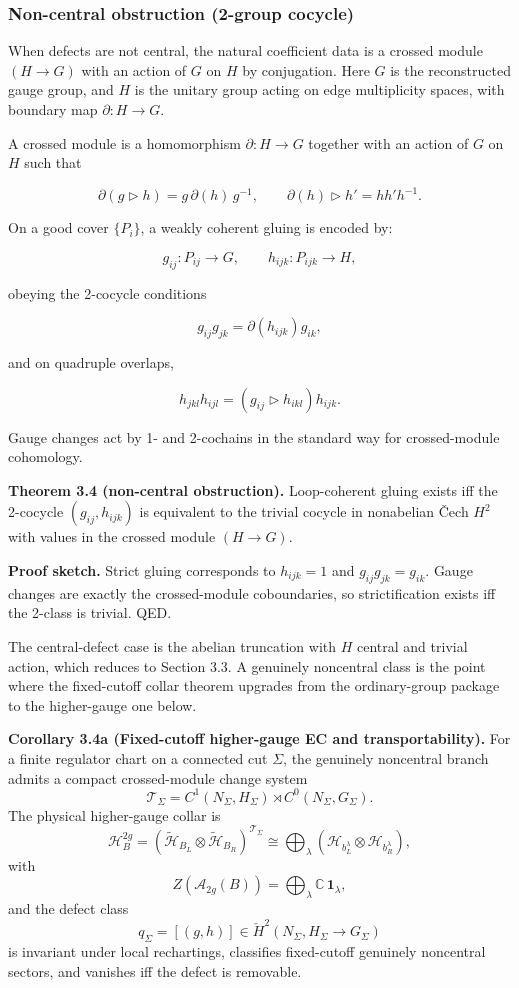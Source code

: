 \subsubsection{Non-central obstruction (2-group cocycle)}\label{34-non-central-obstruction-2-group-cocycle}

When defects are not central, the natural coefficient data is a crossed module \((H \to G)\) with an action of \(G\) on \(H\) by conjugation. Here \(G\) is the reconstructed gauge group, and \(H\) is the unitary group acting on edge multiplicity spaces, with boundary map \(\partial: H \to G\).

A crossed module is a homomorphism \(\partial: H \to G\) together with an action of \(G\) on \(H\) such that

\[
\partial(g \triangleright h) = g\,\partial(h)\,g^{-1},
\qquad
\partial(h) \triangleright h' = h h' h^{-1}.
\]

On a good cover \(\{P_i\}\), a weakly coherent gluing is encoded by:

\[
g_{ij}: P_{ij} \to G,\qquad h_{ijk}: P_{ijk} \to H,
\]

obeying the 2-cocycle conditions

\[
g_{ij} g_{jk} = \partial(h_{ijk}) g_{ik},
\]

and on quadruple overlaps,

\[
h_{jkl} h_{ijl} = (g_{ij} \triangleright h_{ikl}) h_{ijk}.
\]

Gauge changes act by 1- and 2-cochains in the standard way for crossed-module cohomology.

\textbf{Theorem 3.4 (non-central obstruction).} Loop-coherent gluing exists iff the 2-cocycle \((g_{ij}, h_{ijk})\) is equivalent to the trivial cocycle in nonabelian \v{C}ech \(H^2\) with values in the crossed module \((H \to G)\).

\textbf{Proof sketch.} Strict gluing corresponds to \(h_{ijk}=1\) and \(g_{ij}g_{jk}=g_{ik}\). Gauge changes are exactly the crossed-module coboundaries, so strictification exists iff the 2-class is trivial. QED.

The central-defect case is the abelian truncation with \(H\) central and trivial action, which reduces to Section 3.3. A genuinely noncentral class is the point where the fixed-cutoff collar theorem upgrades from the ordinary-group package to the higher-gauge one below.

\textbf{Corollary 3.4a (Fixed-cutoff higher-gauge EC and transportability).} For a finite regulator chart on a connected cut \(\Sigma\), the genuinely noncentral branch admits a compact crossed-module change system
\[
\mathcal T_\Sigma
=
C^1(N_\Sigma,H_\Sigma)\rtimes C^0(N_\Sigma,G_\Sigma).
\]
The physical higher-gauge collar is
\[
\mathcal H_B^{2g}
=
(\widetilde{\mathcal H}_{B_L}\otimes \widetilde{\mathcal H}_{B_R})^{\mathcal T_\Sigma}
\cong
\bigoplus_\lambda
(\mathcal H_{b_L^\lambda}\otimes \mathcal H_{b_R^\lambda}),
\]
with
\[
Z(\mathcal A_{2g}(B))
=
\bigoplus_\lambda \mathbb C\,\mathbf 1_\lambda,
\]
and the defect class
\[
q_\Sigma=[(g,h)]\in \check H^2(N_\Sigma,H_\Sigma\to G_\Sigma)
\]
is invariant under local rechartings, classifies fixed-cutoff genuinely noncentral sectors, and vanishes iff the defect is removable.

